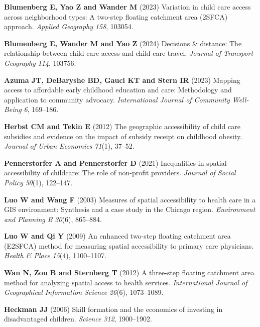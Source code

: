 \documentclass{CUP-JNL-DAP}%
\begin{document}
\begin{Backmatter}
\begin{thebibliography}{}
\textbf{Blumenberg E, Yao Z and Wander M} (2023) Variation in child care access across neighborhood types: A two-step floating catchment area (2SFCA) approach. \textit{Applied Geography} \textit{158}, 103054.

\textbf{Blumenberg E, Wander M and Yao Z} (2024) Decisions \& distance: The relationship between child care access and child care travel. \textit{Journal of Transport Geography} \textit{114}, 103756.

\textbf{Azuma JT, DeBaryshe BD, Gauci KT and Stern IR} (2023) Mapping access to affordable early childhood education and care: Methodology and application to community advocacy. \textit{International Journal of Community Well-Being} \textit{6}, 169--186.

\textbf{Herbst CM and Tekin E} (2012) The geographic accessibility of child care subsidies and evidence on the impact of subsidy receipt on childhood obesity. \textit{Journal of Urban Economics} \textit{71}(1), 37--52.

\textbf{Pennerstorfer A and Pennerstorfer D} (2021) Inequalities in spatial accessibility of childcare: The role of non-profit providers. \textit{Journal of Social Policy} \textit{50}(1), 122--147.

\textbf{Luo W and Wang F} (2003) Measures of spatial accessibility to health care in a GIS environment: Synthesis and a case study in the Chicago region. \textit{Environment and Planning B} \textit{30}(6), 865--884.

\textbf{Luo W and Qi Y} (2009) An enhanced two-step floating catchment area (E2SFCA) method for measuring spatial accessibility to primary care physicians. \textit{Health \& Place} \textit{15}(4), 1100--1107.

\textbf{Wan N, Zou B and Sternberg T} (2012) A three-step floating catchment area method for analyzing spatial access to health services. \textit{International Journal of Geographical Information Science} \textit{26}(6), 1073--1089.

\textbf{Heckman JJ} (2006) Skill formation and the economics of investing in disadvantaged children. \textit{Science} \textit{312}, 1900--1902.


\end{thebibliography}
\end{Backmatter}
\end{document}
